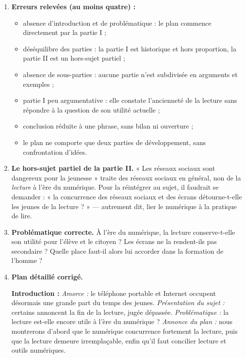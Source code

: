 \documentclass[11pt]{article}
\begin{document}
\begin{corrige}

\begin{enumerate}
\item \textbf{Erreurs relevées (au moins quatre) :}
\begin{itemize}
\item absence d'introduction et de problématique : le plan commence directement par la partie I ;
\item déséquilibre des parties : la partie I est historique et hors proportion, la partie II est un hors-sujet partiel ;
\item absence de sous-parties : aucune partie n'est subdivisée en arguments et exemples ;
\item partie I peu argumentative : elle constate l'ancienneté de la lecture sans répondre à la question de son utilité actuelle ;
\item conclusion réduite à une phrase, sans bilan ni ouverture ;
\item le plan ne comporte que deux parties de développement, sans confrontation d'idées.
\end{itemize}

\item \textbf{Le hors-sujet partiel de la partie II.} « Les réseaux sociaux sont dangereux pour la jeunesse » traite des réseaux sociaux en général, non de la \emph{lecture} à l'ère du numérique. Pour la réintégrer au sujet, il faudrait se demander : « la concurrence des réseaux sociaux et des écrans détourne-t-elle les jeunes de la lecture ? » — autrement dit, lier le numérique à la pratique de lire.

\item \textbf{Problématique correcte.} À l'ère du numérique, la lecture conserve-t-elle son utilité pour l'élève et le citoyen ? Les écrans ne la rendent-ils pas secondaire ? Quelle place faut-il alors lui accorder dans la formation de l'homme ?

\item \textbf{Plan détaillé corrigé.}

\textbf{Introduction :} \emph{Amorce :} le téléphone portable et Internet occupent désormais une grande part du temps des jeunes. \emph{Présentation du sujet :} certains annoncent la fin de la lecture, jugée dépassée. \emph{Problématique :} la lecture est-elle encore utile à l'ère du numérique ? \emph{Annonce du plan :} nous montrerons d'abord que le numérique concurrence fortement la lecture, puis que la lecture demeure irremplaçable, enfin qu'il faut concilier lecture et outils numériques.


\end{enumerate}
\end{corrige}
\end{document}
